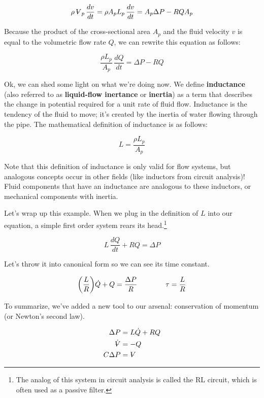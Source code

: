 \documentclass{report}
\newcommand{\Volume}{{\ooalign{\hfil$V$\hfil\cr\kern0.08em--\hfil\cr}}}
\begin{document}
\begin{onehalfspacing}
\begin{flushleft}
\vspace{-0.1in}
\[\rho \, \Volume_p \, \frac{dv}{dt} = \rho A_p L_p \, \frac{dv}{dt} = A_p \Delta P - RQ A_p\]

Because the product of the cross-sectional area \(A_p\) and the fluid velocity \(v\) is equal to the volumetric flow rate \(Q\), we can rewrite this equation as follows:

\vspace{-0.1in}
\[\frac{\rho L_p}{A_p} \, \frac{dQ}{dt} = \Delta P - RQ\]

Ok, we can shed some light on what we're doing now. We define \textbf{inductance} (also referred to as \textbf{liquid-flow inertance} or \textbf{inertia}) as a term that describes the change in potential required for a unit rate of fluid flow. Inductance is the tendency of the fluid to move; it's created by the inertia of water flowing through the pipe. The mathematical definition of inductance is as follows:

\vspace{-0.1in}
\[L = \frac{\rho L_p}{A_p}\]

Note that this definition of inductance is only valid for flow systems, but analogous concepts occur in other fields (like inductors from circuit analysis)! Fluid components that have an inductance are analogous to these inductors, or mechanical components with inertia. 

\medskip

Let's wrap up this example. When we plug in the definition of \(L\) into our equation, a simple first order system rears its head.\footnote{The analog of this system in circuit analysis is called the RL circuit, which is often used as a passive filter.}

\vspace{-0.1in}
\[L \, \frac{dQ}{dt} + RQ = \Delta P\]

Let's throw it into canonical form so we can see its time constant.

\vspace{-0.1in}
\[\qty(\frac{L}{R}) \dot{Q} + Q = \frac{\Delta P}{R} \qquad \qquad \tau = \frac{L}{R}\]

To summarize, we've added a new tool to our arsenal: conservation of momentum (or Newton's second law). 

\vspace{-0.25in}
\begin{align*}
    \Delta P &= L \dot{Q} + RQ \\
    \dot{\Volume} &= -Q\\
    C \Delta P &= \Volume
\end{align*}
\vspace{-0.25in}


\end{flushleft}
\end{onehalfspacing}
\end{document}
